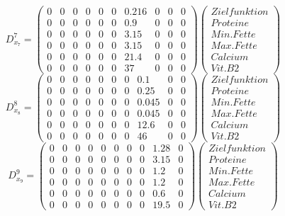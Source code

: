 \documentclass[a4paper,12pt]{article}
\begin{document}
\[
D^7_{x_7} = \begin{pmatrix}
0 & 0 & 0 & 0 & 0 & 0 & 0.216 & 0 & 0 & 0 \\ %
0 & 0 & 0 & 0 & 0 & 0 & 0.9 & 0 & 0 & 0 \\ %
0 & 0 & 0 & 0 & 0 & 0 & 3.15 & 0 & 0 & 0 \\ %
0 & 0 & 0 & 0 & 0 & 0 & 3.15 & 0 & 0 & 0 \\ %
0 & 0 & 0 & 0 & 0 & 0 & 21.4 & 0 & 0 & 0 \\ %
0 & 0 & 0 & 0 & 0 & 0 & 37 & 0 & 0 & 0 %
\end{pmatrix}
\begin{pmatrix}
    Zielfunktion \\
    Proteine \\
    Min. Fette \\
    Max. Fette \\
    Calcium \\
    Vit. B2
\end{pmatrix}
\]
\[
D^8_{x_8} = \begin{pmatrix}
0 & 0 & 0 & 0 & 0 & 0 & 0 & 0.1 & 0 & 0 \\ %
0 & 0 & 0 & 0 & 0 & 0 & 0 & 0.25 & 0 & 0 \\ %
0 & 0 & 0 & 0 & 0 & 0 & 0 & 0.045 & 0 & 0 \\ %
0 & 0 & 0 & 0 & 0 & 0 & 0 & 0.045 & 0 & 0 \\ %
0 & 0 & 0 & 0 & 0 & 0 & 0 & 12.6 & 0 & 0 \\ %
0 & 0 & 0 & 0 & 0 & 0 & 0 & 46 & 0 & 0 %
\end{pmatrix}
\begin{pmatrix}
    Zielfunktion \\
    Proteine \\
    Min. Fette \\
    Max. Fette \\
    Calcium \\
    Vit. B2
\end{pmatrix}
\]
\[
D^9_{x_9} = \begin{pmatrix}
0 & 0 & 0 & 0 & 0 & 0 & 0 & 0 & 1.28 & 0 \\ %
0 & 0 & 0 & 0 & 0 & 0 & 0 & 0 & 3.15 & 0 \\ %
0 & 0 & 0 & 0 & 0 & 0 & 0 & 0 & 1.2 & 0 \\ %
0 & 0 & 0 & 0 & 0 & 0 & 0 & 0 & 1.2 & 0 \\ %
0 & 0 & 0 & 0 & 0 & 0 & 0 & 0 & 0.6 & 0 \\ %
0 & 0 & 0 & 0 & 0 & 0 & 0 & 0 & 19.5 & 0 %
\end{pmatrix}
\begin{pmatrix}
    Zielfunktion \\
    Proteine \\
    Min. Fette \\
    Max. Fette \\
    Calcium \\
    Vit. B2
\end{pmatrix}
\]
\end{document}
